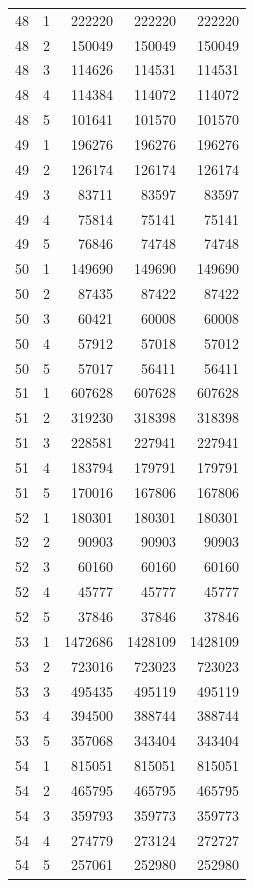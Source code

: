 \begin{longtable}{rrrrr}
48 & 1 & 222220 & 222220 & 222220 \\
48 & 2 & 150049 & 150049 & 150049 \\
48 & 3 & 114626 & 114531 & 114531 \\
48 & 4 & 114384 & 114072 & 114072 \\
48 & 5 & 101641 & 101570 & 101570 \\
49 & 1 & 196276 & 196276 & 196276 \\
49 & 2 & 126174 & 126174 & 126174 \\
49 & 3 & 83711 & 83597 & 83597 \\
49 & 4 & 75814 & 75141 & 75141 \\
49 & 5 & 76846 & 74748 & 74748 \\
50 & 1 & 149690 & 149690 & 149690 \\
50 & 2 & 87435 & 87422 & 87422 \\
50 & 3 & 60421 & 60008 & 60008 \\
50 & 4 & 57912 & 57018 & 57012 \\
50 & 5 & 57017 & 56411 & 56411 \\
51 & 1 & 607628 & 607628 & 607628 \\
51 & 2 & 319230 & 318398 & 318398 \\
51 & 3 & 228581 & 227941 & 227941 \\
51 & 4 & 183794 & 179791 & 179791 \\
51 & 5 & 170016 & 167806 & 167806 \\
52 & 1 & 180301 & 180301 & 180301 \\
52 & 2 & 90903 & 90903 & 90903 \\
52 & 3 & 60160 & 60160 & 60160 \\
52 & 4 & 45777 & 45777 & 45777 \\
52 & 5 & 37846 & 37846 & 37846 \\
53 & 1 & 1472686 & 1428109 & 1428109 \\
53 & 2 & 723016 & 723023 & 723023 \\
53 & 3 & 495435 & 495119 & 495119 \\
53 & 4 & 394500 & 388744 & 388744 \\
53 & 5 & 357068 & 343404 & 343404 \\
54 & 1 & 815051 & 815051 & 815051 \\
54 & 2 & 465795 & 465795 & 465795 \\
54 & 3 & 359793 & 359773 & 359773 \\
54 & 4 & 274779 & 273124 & 272727 \\
54 & 5 & 257061 & 252980 & 252980 \\

\end{longtable}
